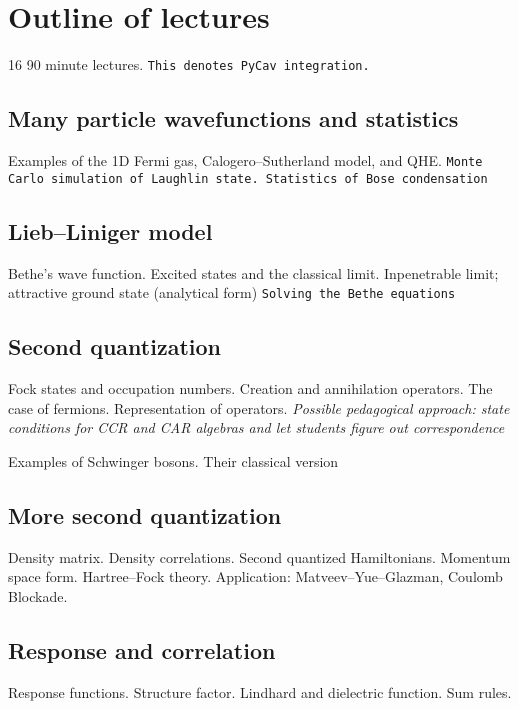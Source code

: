 \section{Outline of lectures}

16 90 minute lectures. \verb|This denotes PyCav integration.|

\subsection{Many particle wavefunctions and statistics}

Examples of the 1D Fermi gas, Calogero--Sutherland model, and QHE. \verb|Monte Carlo simulation of Laughlin state. Statistics of Bose condensation|

\subsection{Lieb--Liniger model}

Bethe's wave function. Excited states and the classical limit. Inpenetrable limit; attractive ground state (analytical form) \verb|Solving the Bethe equations|

\subsection{Second quantization}

Fock states and occupation numbers. Creation and annihilation operators. The case of fermions. Representation of operators. \textit{Possible pedagogical approach: state conditions for CCR and CAR algebras and let students figure out correspondence}

Examples of Schwinger bosons. Their classical version

\subsection{More second quantization}

Density matrix. Density correlations. Second quantized Hamiltonians. Momentum space form. Hartree--Fock theory. Application: Matveev--Yue--Glazman, Coulomb Blockade. 

\subsection{Response and correlation}

Response functions. Structure factor. Lindhard and dielectric function. Sum rules.

